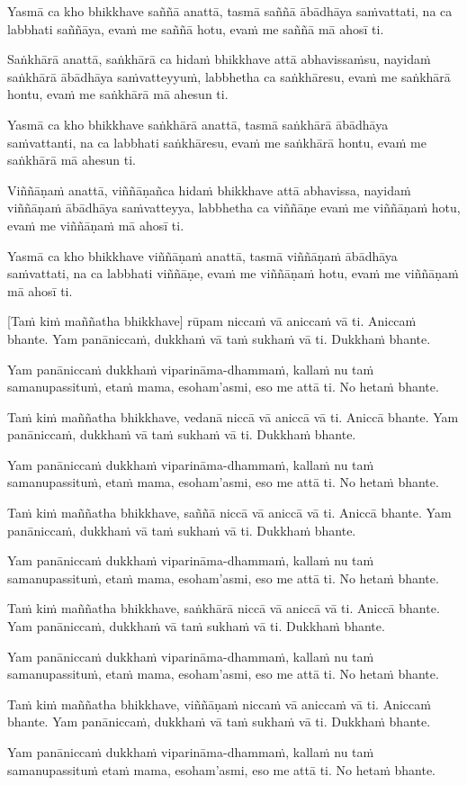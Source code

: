 Yasmā ca kho bhikkhave saññā anattā, tasmā saññā ābādhāya saṁvattati,
na ca labbhati saññāya, evaṁ me saññā hotu, evaṁ me saññā mā ahosī ti.

Saṅkhārā anattā, saṅkhārā ca hidaṁ bhikkhave attā abhavissaṁsu, nayidaṁ
saṅkhārā ābādhāya saṁvatteyyuṁ, labbhetha ca saṅkhāresu, evaṁ me
saṅkhārā hontu, evaṁ me saṅkhārā mā ahesun ti.

Yasmā ca kho bhikkhave saṅkhārā anattā, tasmā saṅkhārā ābādhāya
saṁvattanti, na ca labbhati saṅkhāresu, evaṁ me saṅkhārā hontu, evaṁ me
saṅkhārā mā ahesun ti.

Viññāṇaṁ anattā, viññāṇañca hidaṁ bhikkhave attā abhavissa, nayidaṁ
viññāṇaṁ ābādhāya saṁvatteyya, labbhetha ca viññāṇe evaṁ me viññāṇaṁ
hotu, evaṁ me viññāṇaṁ mā ahosī ti.

Yasmā ca kho bhikkhave viññāṇaṁ anattā, tasmā viññāṇaṁ ābādhāya
saṁvattati, na ca labbhati viññāṇe, evaṁ me viññāṇaṁ hotu, evaṁ me
viññāṇaṁ mā ahosī ti.

[Taṁ kiṁ maññatha bhikkhave] rūpam niccaṁ vā aniccaṁ vā ti.
Aniccaṁ bhante.
Yam panāniccaṁ, dukkhaṁ vā taṁ sukhaṁ vā ti.
Dukkhaṁ bhante.

Yam panāniccaṁ dukkhaṁ viparināma-dhammaṁ, kallaṁ nu taṁ samanupassituṁ,
etaṁ mama, esoham'asmi, eso me attā ti.
No hetaṁ bhante.

Taṁ kiṁ maññatha bhikkhave, vedanā niccā vā aniccā vā ti.
Aniccā bhante.
Yam panāniccaṁ, dukkhaṁ vā taṁ sukhaṁ vā ti.
Dukkhaṁ bhante.

Yam panāniccaṁ dukkhaṁ viparināma-dhammaṁ, kallaṁ nu taṁ samanupassituṁ,
etaṁ mama, esoham'asmi, eso me attā ti.
No hetaṁ bhante.

Taṁ kiṁ maññatha bhikkhave, saññā niccā vā aniccā vā ti.
Aniccā bhante.
Yam panāniccaṁ, dukkhaṁ vā taṁ sukhaṁ vā ti.
Dukkhaṁ bhante.

Yam panāniccaṁ dukkhaṁ viparināma-dhammaṁ, kallaṁ nu taṁ samanupassituṁ,
etaṁ mama, esoham'asmi, eso me attā ti.
No hetaṁ bhante.

Taṁ kiṁ maññatha bhikkhave, saṅkhārā niccā vā aniccā vā ti.
Aniccā bhante.
Yam panāniccaṁ, dukkhaṁ vā taṁ sukhaṁ vā ti.
Dukkhaṁ bhante.

Yam panāniccaṁ dukkhaṁ viparināma-dhammaṁ, kallaṁ nu taṁ samanupassituṁ,
etaṁ mama, esoham'asmi, eso me attā ti.
No hetaṁ bhante.

Taṁ kiṁ maññatha bhikkhave, viññāṇaṁ niccaṁ vā aniccaṁ vā ti.
Aniccaṁ bhante.
Yam panāniccaṁ, dukkhaṁ vā taṁ sukhaṁ vā ti.
Dukkhaṁ bhante.

Yam panāniccaṁ dukkhaṁ viparināma-dhammaṁ, kallaṁ nu taṁ samanupassituṁ
etaṁ mama, esoham'asmi, eso me attā ti.
No hetaṁ bhante.

